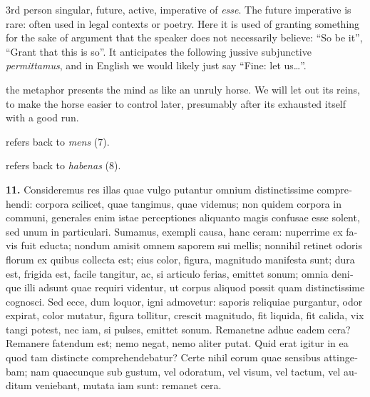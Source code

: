  3rd person singular, future, active, imperative of \textit{esse}. The future imperative is rare: often used in legal contexts or poetry. Here it is used of granting something for the sake of argument that the speaker does not necessarily believe: ``So be it'', ``Grant that this is so''. It anticipates the following jussive subjunctive \textit{permittamus}, and in English we would likely just say ``Fine: let us\dots''.

 the metaphor presents the mind as like an unruly horse. We will let out its reins, to make the horse easier to control later, presumably after its exhausted itself with a good run.

 refers back to \textit{mens} (7).

 refers back to \textit{habenas} (8).

\clearpage

\beginnumbering
\pstart
\begin{latin}
    \textenglish{\textbf{11.}} Consideremus res illas quae vulgo putantur omnium distinctissime comprehendi: corpora scilicet, quae tangimus, quae videmus; non quidem corpora in communi, generales enim istae perceptiones aliquanto magis confusae esse solent, sed unum in particulari. Sumamus, exempli causa, hanc ceram: nuperrime ex favis fuit educta; nondum amisit omnem saporem sui mellis; nonnihil retinet odoris florum ex quibus collecta est; eius color, figura, magnitudo manifesta sunt; dura est, frigida est, facile tangitur, ac, si articulo ferias, emittet sonum; omnia denique illi adsunt quae requiri videntur, ut corpus aliquod possit quam distinctissime cognosci. Sed ecce, dum loquor, igni admovetur: saporis reliquiae purgantur, odor expirat, color mutatur, figura tollitur, crescit magnitudo, fit liquida, fit calida, vix tangi potest, nec iam, si pulses, emittet sonum. Remanetne adhuc eadem cera? Remanere fatendum est; nemo negat, nemo aliter putat. Quid erat igitur in ea quod tam distincte comprehendebatur? Certe nihil eorum quae sensibus attingebam; nam quaecunque sub gustum, vel odoratum, vel visum, vel tactum, vel auditum veniebant, mutata iam sunt: remanet cera.
\end{latin}
\pend
\endnumbering

\prenotes

